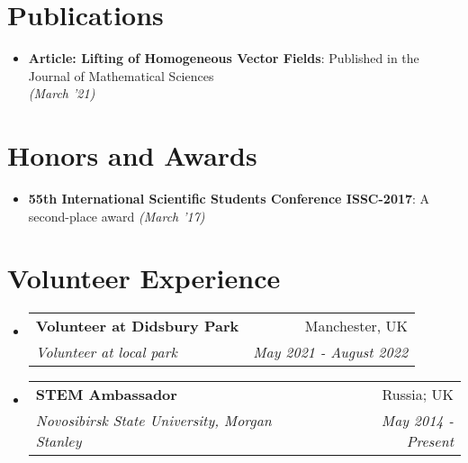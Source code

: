 \documentclass[a4paper,12pt]{extarticle}
\makeatletter
\newcommand{\resumeItem}[2]{
  \item\small{
    \textbf{#1}{: #2 \vspace{-2pt}}
  }
}
\newcommand{\resumeSubheading}[4]{
  \vspace{-1pt}\item
    \begin{tabular*}{0.97\textwidth}{l@{\extracolsep{\fill}}r}
      \textbf{#1} & #2 \\
      \textit{#3} & \textit{#4} \\
    \end{tabular*}\vspace{-5pt}
}
\newcommand{\resumeSubItem}[2]{\resumeItem{#1}{#2}\vspace{-3pt}}
\newcommand{\resumeSubHeadingListStart}{\begin{itemize}[leftmargin=*]}
\newcommand{\resumeSubHeadingListEnd}{\end{itemize}}
\makeatother
\begin{document}
\section{Publications}
\resumeSubHeadingListStart
\resumeSubItem{Article: Lifting of Homogeneous Vector Fields}{Published in the Journal of Mathematical Sciences \\ \it{(March '21)}}
\resumeSubHeadingListEnd
\vspace{-10pt}

\section{Honors and Awards}
\resumeSubHeadingListStart
\resumeSubItem{55th International Scientific Students Conference ISSC-2017}{A second-place award \it{(March '17)}}
\resumeSubHeadingListEnd

\vspace{-10pt}
\section{Volunteer Experience}
  \resumeSubHeadingListStart
	\resumeSubheading
    {Volunteer at Didsbury Park}{Manchester, UK}
    {Volunteer at local park}{May 2021 - August 2022}
  \resumeSubheading
    {STEM Ambassador}{Russia; UK}
    {Novosibirsk State University, Morgan Stanley}{May 2014 - Present}
\resumeSubHeadingListEnd
\end{document}
